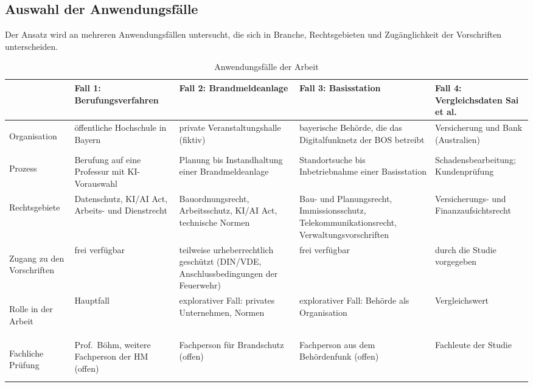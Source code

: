 \subsection{Auswahl der Anwendungsfälle}
Der Ansatz wird an mehreren Anwendungsfällen untersucht, die sich in Branche, Rechtsgebieten und Zugänglichkeit der Vorschriften unterscheiden.

\begin{table}[H]
  \centering
  \small
  \renewcommand{\arraystretch}{1.3}
  \begin{tabularx}{\textwidth}{>{\bfseries\raggedright\arraybackslash}p{2.2cm} Y Y Y Y}
    \toprule
     & \textbf{Fall 1: Berufungsverfahren} & \textbf{Fall 2: Brandmeldeanlage} & \textbf{Fall 3: Basisstation} & \textbf{Fall 4: Vergleichsdaten Sai et al.} \\
    \midrule
    Organisation & öffentliche Hochschule in Bayern & private Veranstaltungshalle (fiktiv) & bayerische Behörde, die das Digitalfunknetz der BOS betreibt & Versicherung und Bank (Australien) \\
    Prozess & Berufung auf eine Professur mit KI-Vorauswahl & Planung bis Instandhaltung einer Brandmeldeanlage & Standortsuche bis Inbetriebnahme einer Basisstation & Schadensbearbeitung; Kundenprüfung \\
    Rechts\-gebiete & Datenschutz, KI/AI Act, Arbeits- und Dienstrecht & Bauordnungsrecht, Arbeitsschutz, KI/AI Act, technische Normen & Bau- und Planungsrecht, Immissionsschutz, Telekommunikationsrecht, Verwaltungsvorschriften & Versicherungs- und Finanzaufsichtsrecht \\
    Zugang zu den Vorschriften & frei verfügbar & teilweise urheberrechtlich geschützt (DIN/VDE, Anschlussbedingungen der Feuerwehr) & frei verfügbar & durch die Studie vorgegeben \\
    Rolle in der Arbeit & Hauptfall & explorativer Fall: privates Unternehmen, Normen & explorativer Fall: Behörde als Organisation & Vergleichswert \\
    Fachliche Prüfung & Prof.\ Böhm, weitere Fachperson der HM (offen) & Fachperson für Brandschutz (offen) & Fachperson aus dem Behördenfunk (offen) & Fachleute der Studie \\
    \bottomrule
  \end{tabularx}
  \caption{Anwendungsfälle der Arbeit}
  \label{tab:anwendungsfaelle}
\end{table}
